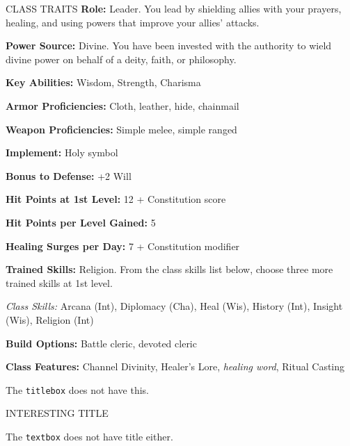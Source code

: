 \begin{traitsbox}{CLASS TRAITS}
	\textbf{Role:} Leader. You lead by shielding allies with your prayers, healing, and using powers that improve your allies' attacks.


	\textbf{Power Source:} Divine. You have been invested with the authority to wield divine power on behalf of a deity, faith, or philosophy.

	\textbf{Key Abilities:} Wisdom, Strength, Charisma

	\vspace{1em}

	\textbf{Armor Proficiencies:} Cloth, leather, hide, chainmail

	\textbf{Weapon Proficiencies:} Simple melee, simple ranged

	\textbf{Implement:} Holy symbol

	\textbf{Bonus to Defense:} +2 Will

	\vspace{1em}

	\textbf{Hit Points at 1st Level:} 12 + Constitution score

	\textbf{Hit Points per Level Gained:} 5

	\textbf{Healing Surges per Day:} 7 + Constitution modifier

	\vspace{1em}

	\textbf{Trained Skills:} Religion. From the class skills list below, choose three more trained skills at 1st level.

	\noindent\textit{Class Skills:} Arcana (Int), Diplomacy (Cha), Heal (Wis), History (Int), Insight (Wis), Religion (Int)

	\vspace{1em}

	\textbf{Build Options:} Battle cleric, devoted cleric

	\textbf{Class Features:} Channel Divinity, Healer's Lore, \textit{healing word}, Ritual Casting

	\vspace{1em}
\end{traitsbox}

The \texttt{titlebox} does not have this.


\begin{titlebox}{INTERESTING TITLE}
	\lipsum[][1-5]
\end{titlebox}

The \texttt{textbox} does not have title either.

